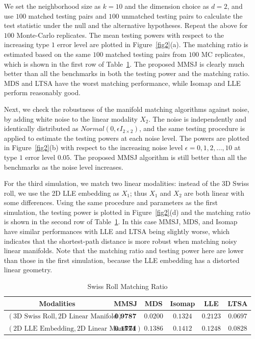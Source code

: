\documentclass[times,twocolumn,final]{elsarticle}
\begin{document}
We set the neighborhood size as $k=10$ and the dimension choice as $d=2$, and use $100$ matched testing pairs and $100$ unmatched testing pairs to calculate the test statistic under the null and the alternative hypotheses. Repeat the above for $100$ Monte-Carlo replicates. The mean testing powers with respect to the increasing type $1$ error level are plotted in Figure~\ref{fig2}(a). The matching ratio is estimated based on the same $100$ matched testing pairs from $100$ MC replicates, which is shown in the first row of Table~\ref{table:Swiss}. The proposed MMSJ is clearly much better than all the benchmarks in both the testing power and the matching ratio. MDS and LTSA have the worst matching performance, while Isomap and LLE perform reasonably good.

Next, we check the robustness of the manifold matching algorithms against noise, by adding white noise to the linear modality $X_{2}$. The noise is independently and identically distributed as $Normal(0, \epsilon I_{2 \times 2})$, and the same testing procedure is applied to estimate the testing powers at each noise level. The powers are plotted in Figure~\ref{fig2}(b) with respect to the increasing noise level $\epsilon = 0,1,2,\ldots,10$ at type $1$ error level $0.05$. The proposed MMSJ algorithm is still better than all the benchmarks as the noise level increases.

For the third simulation, we match two linear modalities: instead of the 3D Swiss roll, we use the 2D LLE embedding as $X_{1}$; thus $X_{1}$ and $X_{2}$ are both linear with some differences. Using the same procedure and parameters as the first simulation, the testing power is plotted in Figure~\ref{fig2}(d) and the matching ratio is shown in the second row of Table~\ref{table:Swiss}. In this case MMSJ, MDS, and Isomap have similar performances with LLE and LTSA being slightly worse, which indicates that the shortest-path distance is more robust when matching noisy linear manifolds. Note that the matching ratio and testing power here are lower than those in the first simulation, because the LLE embedding has a distorted linear geometry. 

\begin{table}[htbp]
\centering
\caption{Swiss Roll Matching Ratio}
\label{table:Swiss}
\begin{tabular}{|c||c|c|c|c|c|}
\hline
Modalities & MMSJ & MDS & Isomap & LLE & LTSA \\
\hline
$(\mbox{3D Swiss Roll}, \mbox{2D Linear Manifold})$ & $\textbf{0.9787}$  & $0.0200$ & $0.1324$ & $0.2123$ & $0.0697$\\
\hline
$(\mbox{2D LLE Embedding}, \mbox{2D Linear Manifold})$ & $\textbf{0.1771}$  & $0.1386$ & $0.1412$ & $0.1248$ & $0.0828$\\
\hline
\end{tabular}
\end{table}
\end{document}
